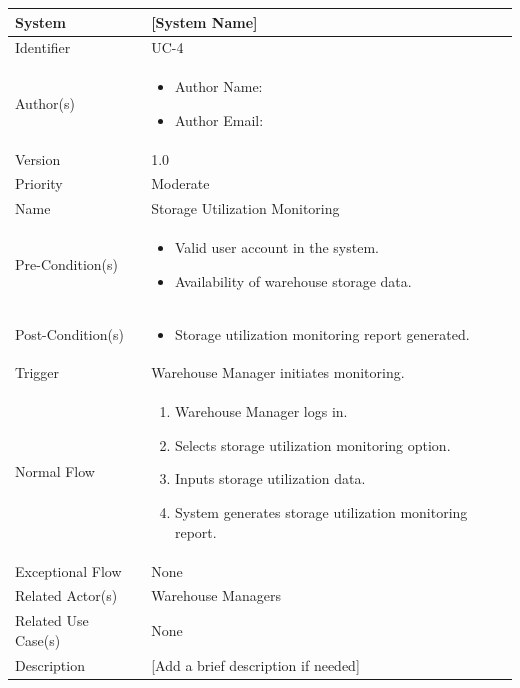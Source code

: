 \begin{center}
	\begin{tabularx}{\textwidth}{|l|X|}
		\hline
		System & [System Name] \\
		\hline
		Identifier & UC-4 \\
		\hline
		Author(s) & \begin{itemize}[left=0pt]
			\item Author Name:
			\item Author Email:
		\end{itemize} \\
		\hline
		Version & 1.0 \\
		\hline
		Priority & Moderate \\
		\hline
		Name & Storage Utilization Monitoring \\
		\hline
		Pre-Condition(s) &  \begin{itemize}[left=0pt]
			\item Valid user account in the system.
			\item Availability of warehouse storage data.
		\end{itemize} \\
		\hline
		Post-Condition(s) & \begin{itemize}[left=0pt]
			\item Storage utilization monitoring report generated.
		\end{itemize} \\
		\hline
		Trigger & Warehouse Manager initiates monitoring. \\
		\hline
		Normal Flow & \begin{enumerate}[left=0pt]
			\item Warehouse Manager logs in.
			\item Selects storage utilization monitoring option.
			\item Inputs storage utilization data.
			\item System generates storage utilization monitoring report.
		\end{enumerate} \\
		\hline
		Exceptional Flow & None \\
		\hline
		Related Actor(s) & Warehouse Managers \\
		\hline
		Related Use Case(s) & None \\
		\hline
		Description & [Add a brief description if needed] \\
		\hline
	\end{tabularx}
\end{center}

